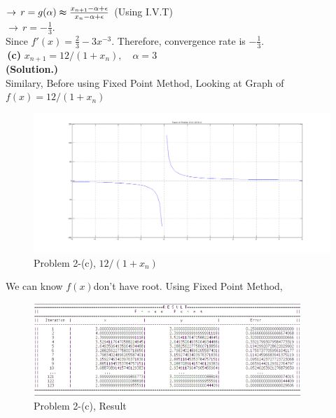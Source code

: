 \documentclass[10pt]{article}
\begin{document}
\begin{flushleft}
	\qquad\qquad\qquad\qquad\qquad\qquad\qquad\qquad\qquad\qquad\qquad\qquad$\rightarrow \, r=g(\alpha) \thickapprox \frac{x_{n+1}-\alpha+\epsilon}{x_n-\alpha+\epsilon}$    (Using I.V.T)\\
	\qquad\qquad\qquad\qquad\qquad\qquad\qquad\qquad\qquad\qquad\qquad\qquad$\rightarrow \, r=-\frac{1}{3}$.\\
	\;\;\;
	\qquad \quad Since $f'(x)=\frac{2}{3}-3x^{-3}$. Therefore, convergence rate is $-\frac{1}{3}$.\\
	\;\;\;\;\newpage
	\quad\,\textbf{(c)} $x_{n+1}=12/(1+x_n),\quad \alpha=3$\\
	\;\;\;
	\qquad \quad \textbf{(Solution.)} \\
	\qquad \quad Similary, Before using Fixed Point Method, Looking at Graph of $f(x)=12/(1+x_n)$\\
	\begin{figure}[!h]
		\centering
		\begin{center}
		\includegraphics[width=1\textwidth]{2-c.png}
		\caption{Problem 2-(c), $12/(1+x_n)$ }
		\end{center}
	\end{figure}
	\qquad \quad We can know $f(x)$don't have root. Using Fixed Point Method, \\
	\begin{figure}[!h]
		\centering
		\begin{center}
		\includegraphics[width=0.9\textwidth]{2-rc.png}
		\caption{Problem 2-(c), Result}
		\end{center}

\end{figure}
\end{flushleft}
\end{document}
